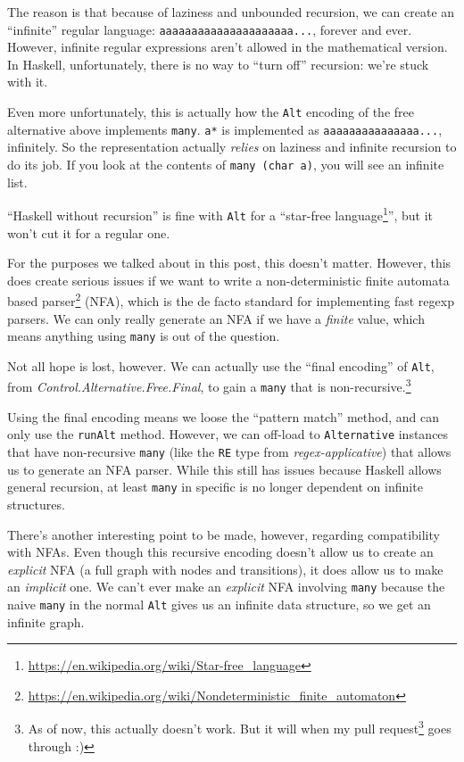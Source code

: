 \documentclass[]{article}
\renewcommand{\href}[2]{#2\footnote{\url{#1}}}
\begin{document}
The reason is that because of laziness and unbounded recursion, we can create an
``infinite'' regular language:
\texttt{a\textbar{}aa\textbar{}aaa\textbar{}aaaa\textbar{}aaaaa\textbar{}aaaaaa\textbar{}...},
forever and ever. However, infinite regular expressions aren't allowed in the
mathematical version. In Haskell, unfortunately, there is no way to ``turn off''
recursion: we're stuck with it.

Even more unfortunately, this is actually how the \texttt{Alt} encoding of the
free alternative above implements \texttt{many}. \texttt{a*} is implemented as
\texttt{\textbar{}a\textbar{}aa\textbar{}aaa\textbar{}aaaa\textbar{}aaaaa\textbar{}...},
infinitely. So the representation actually \emph{relies} on laziness and
infinite recursion to do its job. If you look at the contents of
\texttt{many\ (char\ \textquotesingle{}a\textquotesingle{})}, you will see an
infinite list.

``Haskell without recursion'' is fine with \texttt{Alt} for a
``\href{https://en.wikipedia.org/wiki/Star-free_language}{star-free language}'',
but it won't cut it for a regular one.

For the purposes we talked about in this post, this doesn't matter. However,
this does create serious issues if we want to write a
\href{https://en.wikipedia.org/wiki/Nondeterministic_finite_automaton}{non-deterministic
finite automata based parser} (NFA), which is the de facto standard for
implementing fast regexp parsers. We can only really generate an NFA if we have
a \emph{finite} value, which means anything using \texttt{many} is out of the
question.

Not all hope is lost, however. We can actually use the ``final encoding'' of
\texttt{Alt}, from \emph{Control.Alternative.Free.Final}, to gain a
\texttt{many} that is non-recursive.\footnote{As of now, this actually doesn't
  work. But it will when my \href{https://github.com/ekmett/free/pull/188}{pull
  request} goes through :)}

Using the final encoding means we loose the ``pattern match'' method, and can
only use the \texttt{runAlt} method. However, we can off-load to
\texttt{Alternative} instances that have non-recursive \texttt{many} (like the
\texttt{RE} type from \emph{regex-applicative}) that allows us to generate an
NFA parser. While this still has issues because Haskell allows general
recursion, at least \texttt{many} in specific is no longer dependent on infinite
structures.

There's another interesting point to be made, however, regarding compatibility
with NFAs. Even though this recursive encoding doesn't allow us to create an
\emph{explicit} NFA (a full graph with nodes and transitions), it does allow us
to make an \emph{implicit} one. We can't ever make an \emph{explicit} NFA
involving \texttt{many} because the naive \texttt{many} in the normal
\texttt{Alt} gives us an infinite data structure, so we get an infinite graph.
\end{document}
